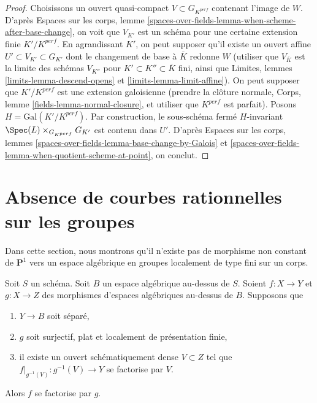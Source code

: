 \begin{proof}
\medskip\noindent
Choisissons un ouvert quasi-compact $V \subset G_{K^{perf}}$ contenant
l'image de $W$. D'après Espaces sur les corps,
lemme \ref{spaces-over-fields-lemma-when-scheme-after-base-change},
on voit que $V_{K'}$ est un schéma pour une certaine extension finie $K'/K^{perf}$.
En agrandissant $K'$, on peut supposer qu'il existe un ouvert affine
$U' \subset V_{K'} \subset G_{K'}$ dont le changement de base à $\overline{K}$
redonne $W$ (utiliser que $V_{\overline{K}}$ est la limite des schémas
$V_{K''}$ pour $K' \subset K'' \subset \overline{K}$ fini, ainsi que
Limites, lemmes \ref{limits-lemma-descend-opens} et
\ref{limits-lemma-limit-affine}). On peut supposer
que $K'/K^{perf}$ est une extension galoisienne (prendre la clôture normale,
Corps, lemme \ref{fields-lemma-normal-closure}, et utiliser
que $K^{perf}$ est parfait). Posons $H = \text{Gal}(K'/K^{perf})$.
Par construction, le sous-schéma fermé $H$-invariant
$\Spec(L) \times_{G_{K^{perf}}} G_{K'}$ est contenu dans $U'$.
D'après
Espaces sur les corps, lemmes
\ref{spaces-over-fields-lemma-base-change-by-Galois} et
\ref{spaces-over-fields-lemma-when-quotient-scheme-at-point}, on conclut.
\end{proof}





\section{Absence de courbes rationnelles sur les groupes}
\label{section-no-rational-curves}

\noindent
Dans cette section, nous montrons qu'il n'existe pas de morphisme non constant
de $\mathbf{P}^1$ vers un espace algébrique en groupes localement de type
fini sur un corps.

\begin{lemma}
\label{lemma-factor-through-over-open}
Soit $S$ un schéma. Soit $B$ un espace algébrique au-dessus de $S$.
Soient $f : X \to Y$ et $g : X \to Z$ des morphismes d'espaces
algébriques au-dessus de $B$. Supposons que
\begin{enumerate}
\item $Y \to B$ soit séparé,
\item $g$ soit surjectif, plat et localement de présentation finie,
\item il existe un ouvert schématiquement dense $V \subset Z$
tel que $f|_{g^{-1}(V)} : g^{-1}(V) \to Y$ se factorise par $V$.
\end{enumerate}
Alors $f$ se factorise par $g$.
\end{lemma}

